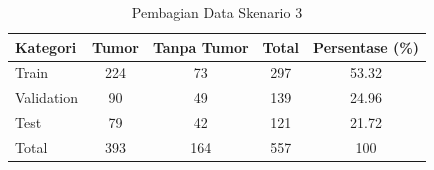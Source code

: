 \begin{table}[H]
	\centering
	\caption{Pembagian Data Skenario 3}
	\label{tab:dataset_all}
	\begin{tabular}{|l|c|c|c|c|}
		\hline
		\textbf{Kategori} & \textbf{Tumor} & \textbf{Tanpa Tumor} & \textbf{Total} & \textbf{Persentase (\%)} \\ \hline
		Train & 224 & 73 & 297 & 53.32 \\ \hline
		Validation & 90 & 49 & 139 & 24.96 \\ \hline
		Test & 79 & 42 & 121 & 21.72 \\ \hline
		Total & 393 & 164 & 557 & 100 \\ \hline
	\end{tabular}
\end{table}